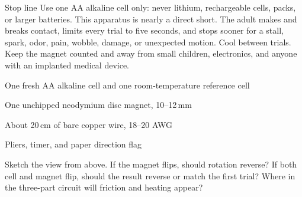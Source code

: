 


\footnotesize

\begin{gate}{Stop line}
Use one AA alkaline cell only: never lithium, rechargeable cells, packs, or
larger batteries. This apparatus is nearly a direct short. The adult makes and
breaks contact, limits every trial to five seconds, and stops sooner for a
stall, spark, odor, pain, wobble, damage, or unexpected motion. Cool between
trials. Keep the magnet counted and away from small children, electronics, and
anyone with an implanted medical device.
\end{gate}

\begin{materials}
\item One fresh AA alkaline cell and one room-temperature reference cell
\item One unchipped neodymium disc magnet, 10--12\,mm
\item About 20\,cm of bare copper wire, 18--20 AWG
\item Pliers, timer, and paper direction flag
\end{materials}

\begin{predict}
Sketch the view from above. If the magnet flips, should rotation reverse? If
both cell and magnet flip, should the result reverse or match the first trial?
Where in the three-part circuit will friction and heating appear?
\end{predict}

